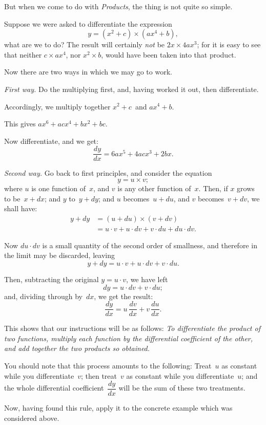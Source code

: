 \documentclass[12pt]{book}[2005/09/16]
\newcommand{\Paragraph}[1]{\medskip\pagebreak[1]\par\textit{#1}}
\newcommand{\DPPageSep}[2]{\Pagelabel{#2}}
\newcommand{\Pagelabel}[1]
  {\phantomsection\label{#1}}
\begin{document}
But when we come to do with \emph{Products}, the thing
is not quite so simple.

Suppose we were asked to differentiate the expression
\[
y = (x^2+c) × (ax^4+b),
\]
what are we to do? The result will certainly \emph{not}
be $2x × 4ax^3$; for it is easy to see that neither $c × ax^4$,
nor $x^2 × b$, would have been taken into that product.

Now there are two ways in which we may go
to work.

\Paragraph{First way.} Do the multiplying first, and, having
worked it out, then differentiate.

Accordingly, we multiply together $x^2 + c$~and $ax^4 + b$.

This gives $ax^6 + acx^4 + bx^2 + bc$.

Now differentiate, and we get:
\[
\dfrac{dy}{dx} = 6ax^5 + 4acx^3 + 2bx.
\]

\Paragraph{Second way.} Go back to first principles, and
consider the equation
\[
y = u × v;
\]
where $u$ is one function of~$x$, and $v$ is any other
function of~$x$. Then, if $x$ grows to be~$x+dx$; and $y$
to~$y+dy$; and $u$ becomes~$u+du$, and $v$ becomes~$v+dv$,
we shall have:
\begin{align*}
 y + dy &= (u + du) × (v + dv) \\
        &= u · v + u · dv + v · du + du · dv.
\end{align*}

Now $du · dv$ is a small quantity of the second order
of smallness, and therefore in the limit may be
discarded, leaving
\[
y + dy = u · v + u · dv + v · du.
\]
\DPPageSep{050.png}{38}%

Then, subtracting the original $y = u· v$, we have left
\[
dy = u · dv + v · du;
\]
and, dividing through by~$dx$, we get the result:
\[
\dfrac{dy}{dx} = u\, \dfrac{dv}{dx} + v\, \dfrac{du}{dx}.
\]

This shows that our instructions will be as follows:\Pagelabel{differprod}
\emph{To differentiate the product of two functions, multiply
each function by the differential coefficient of the
other, and add together the two products so obtained.}

You should note that this process amounts to
the following: Treat~$u$ as constant while you
differentiate~$v$; then treat~$v$ as constant while you
differentiate~$u$; and the whole differential coefficient~$\dfrac{dy}{dx}$
will be the sum of these two treatments.

Now, having found this rule, apply it to the
concrete example which was considered above.
\end{document}
